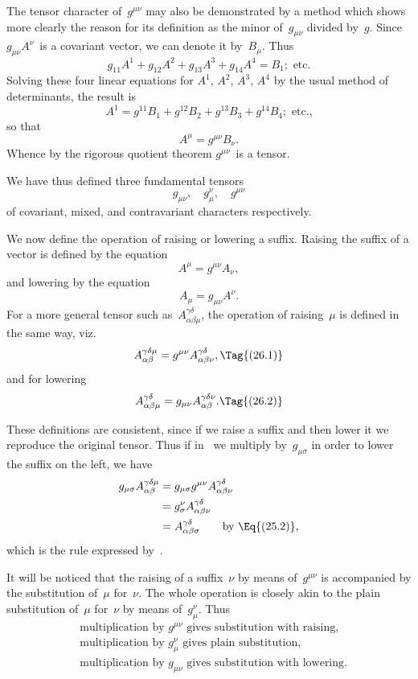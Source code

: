 \documentclass[12pt]{book}
\begin{document}
The tensor character of~$g^{\mu\nu}$ may also be demonstrated by a method which
shows more clearly the reason for its definition as the minor of~$g_{\mu\nu}$ divided by~$g$.
Since $g_{\mu\nu} A^{\nu}$~is a covariant vector, we can denote it by~$B_{\mu}$. Thus
\[
g_{11} A^{1} + g_{12} A^{2} + g_{13} A^{3} + g_{14} A^{4} = B_{1}; \text{ etc.}
\]
Solving these four linear equations for $A^{1}$, $A^{2}$, $A^{3}$, $A^{4}$ by the usual method of
determinants, the result is
\[
A^{1} = g^{11} B_{1} + g^{12} B_{2} + g^{13} B_{3} + g^{14} B_{4}; \text{ etc.,}
\]
so that
\[
A^{\mu} = g^{\mu\nu} B_{\nu}.
\]
Whence by the rigorous quotient theorem $g^{\mu\nu}$~is a tensor.

We have thus defined three fundamental tensors
\[
g_{\mu\nu},\quad
g_{\mu}^{\nu},\quad
g^{\mu\nu}
\]
of covariant, mixed, and contravariant characters respectively.

%

We now define the operation of raising or lowering a suffix. Raising the
%
suffix of a vector is defined by the equation
\[
A^{\mu} = g^{\mu\nu} A_{\nu},
\]
and lowering by the equation
\[
A_{\mu} = g_{\mu\nu} A^{\nu}.
\]
For a more general tensor such as~$A_{\alpha\beta\mu}^{\gamma\delta}$, the operation of raising~$\mu$ is defined
in the same way, viz.\
\[
A_{\alpha\beta}^{\gamma\delta\mu} = g^{\mu\nu} A_{\alpha\beta\nu}^{\gamma\delta},
\Tag{(26.1)}
\]
and for lowering
\[
A_{\alpha\beta\mu}^{\gamma\delta} = g_{\mu\nu} A_{\alpha\beta}^{\gamma\delta\nu}.
\Tag{(26.2)}
\]

These definitions are consistent, since if we raise a suffix and then lower
it we reproduce the original tensor. Thus if in~\Eq{(26.1)} we multiply by~$g_{\mu\sigma}$ in
order to lower the suffix on the left, we have
\begin{align*}
  g_{\mu\sigma} A_{\alpha\beta}^{\gamma\delta\mu}
  &= g_{\mu\sigma} g^{\mu\nu} A_{\alpha\beta\nu}^{\gamma\delta} \\
  &= g_{\sigma}^{\nu} A_{\alpha\beta\nu}^{\gamma\delta} \\
  &= A_{\alpha\beta\sigma}^{\gamma\delta}\qquad\text{by \Eq{(25.2)},}
\end{align*}
which is the rule expressed by~.

It will be noticed that the raising of a suffix~$\nu$ by means of~$g^{\mu\nu}$ is accompanied
by the substitution of~$\mu$ for~$\nu$. The whole operation is closely akin to
the plain substitution of~$\mu$ for~$\nu$ by means of~$g_{\mu}^{\nu}$. Thus
\begin{align*}
  &\text{multiplication by $g^{\mu\nu}$ gives substitution with raising,} \\
  &\text{multiplication by $g_{\mu}^{\nu}$ gives plain substitution,} \\
  &\text{multiplication by $g_{\mu\nu}$ gives substitution with lowering.}
\end{align*}
\end{document}
